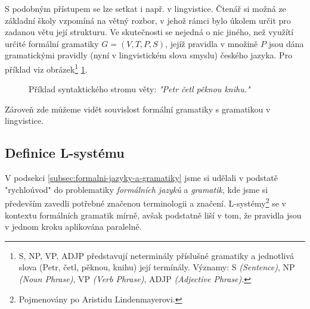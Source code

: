 S podobným přístupem se lze setkat i např. v lingvistice. Čtenář si možná ze základní školy vzpomíná na větný rozbor, v jehož rámci bylo úkolem určit pro zadanou větu její strukturu. Ve skutečnosti se nejedná o nic jiného, než využítí určité formální gramatiky $G=(V,T,P,S)$, jejíž pravidla v množině $P$ jsou dána gramatickými pravidly (nyní v lingvistickém slova smyslu) českého jazyka. Pro příklad viz obrázek\footnote{S, NP, VP, ADJP představují neterminály příslušné gramatiky a jednotlivá slova (Petr, četl, pěknou, knihu) její termínály. Významy: S \emph{(Sentence)}, NP \emph{(Noun Phrase)}, VP \emph{(Verb Phrase)}, ADJP \emph{(Adjective Phrase)}.} \ref{fig:syntax-strom-vety}.
\begin{figure}[h]
    \centering
    \caption{Příklad syntaktického stromu věty: \emph{"Petr četl pěknou knihu."}}
    \label{fig:syntax-strom-vety}
\end{figure}
Zároveň zde můžeme vidět souvislost formální gramatiky s gramatikou v lingvistice.

\subsection{Definice L-systému}\label{subsec:definice-lsystemu}

V podsekci \ref{subsec:formalni-jazyky-a-gramatiky} jsme si udělali v podstatě "rychloúvod" do problematiky \emph{formálních jazyků} a \emph{gramatik}, kde jsme si především zavedli potřebné značenou terminologii a značení. L-systémy\footnote{Pojmenovány po Aristidu Lindenmayerovi.} se v kontextu formálních gramatik mírně, avšak podstatně liší v tom, že pravidla jsou v jednom kroku aplikována paralelně.


